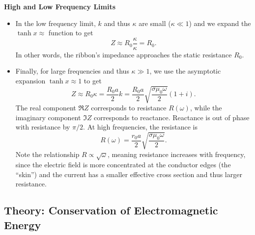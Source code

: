 \documentclass[11pt, a4paper]{article}
\renewcommand{\vec}[1]{\bm{#1}} %
\newcommand{\mm}{\mu_{0}}  %
\newcommand{\m}{\vec{m}}  %
\begin{document}
\textbf{High and Low Frequency Limits}
\begin{itemize}

	\item In the low frequency limit, $ k $ and thus $ \kappa $ are small ($ \kappa \ll 1 $) and we expand the $ \tanh x \approx  $ function to get
	\begin{equation*}
		Z \approx R_{0} \frac{\kappa}{\kappa} = R_{0}.
	\end{equation*}
	In other words, the ribbon's impedance approaches the static resistance $ R_{0} $.
	
	\item Finally, for large frequencies and thus $ \kappa \gg 1 $, we use the asymptotic expansion $ \tanh x \approx 1 $ to get
	\begin{equation*}
		Z \approx R_{0}\kappa = \frac{R_{0}a}{2}k = \frac{R_{0}a}{2} \sqrt{\frac{\sigma \mm \omega}{2}}(1 + i).
	\end{equation*}
	The real component $ \Re Z $ corresponds to resistance $ R(\omega) $, while the imaginary component $ \Im Z $ corresponds to reactance. Reactance is out of phase with resistance by $ \pi/2 $. At high frequencies, the resistance is
	\begin{equation*}
		R(\omega) = \frac{r_{0}a}{2}\sqrt{\frac{\sigma \mm \omega}{2}}.
	\end{equation*}
	Note the relationship $ R \propto \sqrt{\omega} $, meaning resistance increases with frequency, since the electric field is more concentrated at the conductor edges (the ``skin'') and the current has a smaller effective cross section and thus larger resistance.
	
	
\end{itemize}

\subsection{Theory: Conservation of Electromagnetic Energy}
\end{document}
